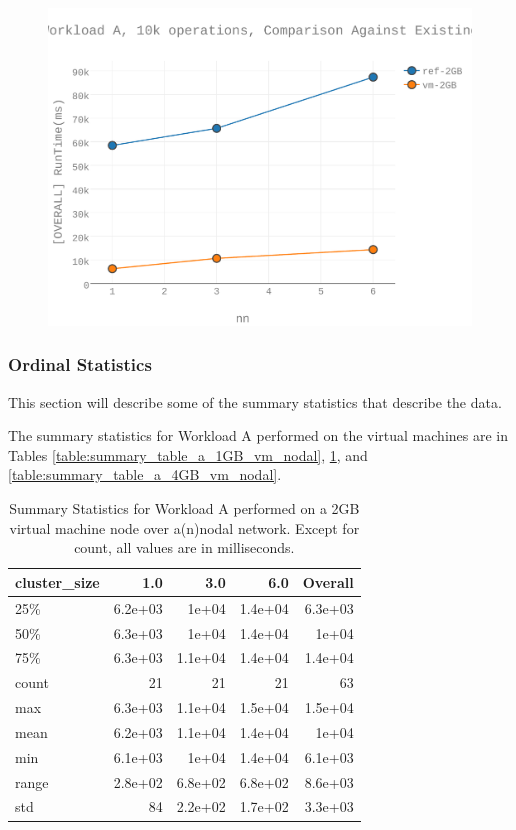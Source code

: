 \begin{figure}[h]
\includegraphics[width=5.5in]{Figures/figures-wla_fig5.pdf}
\caption{}
\label{figures-wla_fig5}
\end{figure}



\subsubsection{Ordinal Statistics}
This section will describe some of the summary statistics that describe the data.  

The summary statistics for Workload A performed on the virtual machines are in Tables \ref{table:summary_table_a_1GB_vm_nodal}, \ref{table:summary_table_a_2GB_vm_nodal}, and \ref{table:summary_table_a_4GB_vm_nodal}.
\begin{table}
\begin{tabular}{lrrrr}
\toprule
cluster\_size &     1.0 &     3.0 &     6.0 &  Overall \\
\midrule
25\%   & 6.2e+03 &   1e+04 & 1.4e+04 &  6.3e+03 \\
50\%   & 6.3e+03 &   1e+04 & 1.4e+04 &    1e+04 \\
75\%   & 6.3e+03 & 1.1e+04 & 1.4e+04 &  1.4e+04 \\
count &      21 &      21 &      21 &       63 \\
max   & 6.3e+03 & 1.1e+04 & 1.5e+04 &  1.5e+04 \\
mean  & 6.2e+03 & 1.1e+04 & 1.4e+04 &    1e+04 \\
min   & 6.1e+03 &   1e+04 & 1.4e+04 &  6.1e+03 \\
range & 2.8e+02 & 6.8e+02 & 6.8e+02 &  8.6e+03 \\
std   &      84 & 2.2e+02 & 1.7e+02 &  3.3e+03 \\
\bottomrule
\end{tabular}
\caption{Summary Statistics for Workload A performed on a 2GB virtual machine node over a(n)nodal network.  Except for count, all values are in milliseconds.}
\label{table:summary_table_a_2GB_vm_nodal}
\end{table}



